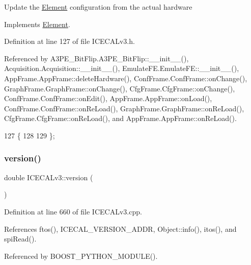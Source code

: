 Update the \hyperlink{classElement}{Element} configuration from the actual hardware 

Implements \hyperlink{classElement_a4e6c83efae95616ebddd03c793a26661}{Element}.



Definition at line 127 of file I\+C\+E\+C\+A\+Lv3.\+h.



Referenced by A3\+P\+E\+\_\+\+Bit\+Flip.\+A3\+P\+E\+\_\+\+Bit\+Flip\+::\+\_\+\+\_\+init\+\_\+\+\_\+(), Acquisition.\+Acquisition\+::\+\_\+\+\_\+init\+\_\+\+\_\+(), Emulate\+F\+E.\+Emulate\+F\+E\+::\+\_\+\+\_\+init\+\_\+\+\_\+(), App\+Frame.\+App\+Frame\+::delete\+Hardware(), Conf\+Frame.\+Conf\+Frame\+::on\+Change(), Graph\+Frame.\+Graph\+Frame\+::on\+Change(), Cfg\+Frame.\+Cfg\+Frame\+::on\+Change(), Conf\+Frame.\+Conf\+Frame\+::on\+Edit(), App\+Frame.\+App\+Frame\+::on\+Load(), Conf\+Frame.\+Conf\+Frame\+::on\+Re\+Load(), Graph\+Frame.\+Graph\+Frame\+::on\+Re\+Load(), Cfg\+Frame.\+Cfg\+Frame\+::on\+Re\+Load(), and App\+Frame.\+App\+Frame\+::on\+Re\+Load().


\begin{DoxyCode}
127                  \{
128     
129   \};
\end{DoxyCode}
\mbox{\label{classICECALv3_a7f3f8012d2e5c45f8e43819befa3f915}} 
\subsubsection{\texorpdfstring{version()}{version()}}
{\footnotesize\ttfamily double I\+C\+E\+C\+A\+Lv3\+::version (\begin{DoxyParamCaption}{ }\end{DoxyParamCaption})}



Definition at line 660 of file I\+C\+E\+C\+A\+Lv3.\+cpp.



References ftos(), I\+C\+E\+C\+A\+L\+\_\+\+V\+E\+R\+S\+I\+O\+N\+\_\+\+A\+D\+DR, Object\+::info(), itos(), and spi\+Read().



Referenced by B\+O\+O\+S\+T\+\_\+\+P\+Y\+T\+H\+O\+N\+\_\+\+M\+O\+D\+U\+L\+E().


